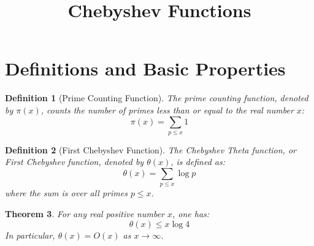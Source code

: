 \documentclass[a4paper]{article}
\title{Chebyshev Functions}
\author{}
\date{}
\newtheorem{theorem}{Theorem}
\newtheorem{definition}[theorem]{Definition}
\begin{document}
\maketitle

\section{Definitions and Basic Properties}

\begin{definition}[Prime Counting Function]
  The prime counting function, denoted by $\pi(x)$, counts the number
  of primes less than or equal to the real number $x$:
  \[ \pi(x) = \sum_{p \le x} 1 \]
\end{definition}

\begin{definition}[First Chebyshev Function]
  The Chebyshev Theta function, or First Chebyshev function, denoted
  by $\theta(x)$, is defined as:
  \[ \theta(x) = \sum_{p \le x} \log p \]
  where the sum is over all primes $p \le x$.
\end{definition}

\begin{theorem}
  For any real positive number $x$, one has:
  \[ \theta(x) \le x \log 4 \]
  In particular, $\theta(x) = O(x)$ as $x \to \infty$.
\end{theorem}
\end{document}
